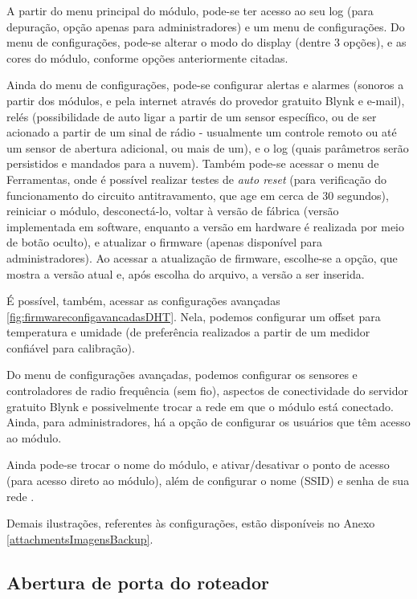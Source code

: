 A partir do menu principal do módulo, pode-se ter acesso ao seu log (para depuração, opção apenas para administradores) e um menu de configurações. Do menu de configurações, pode-se alterar o modo do display (dentre 3 opções), e as cores do módulo, conforme opções anteriormente citadas.

Ainda do menu de configurações, pode-se configurar alertas e alarmes (sonoros a partir dos módulos, e pela internet através do provedor gratuito Blynk e e-mail), relés (possibilidade de auto ligar a partir de um sensor específico, ou de ser acionado a partir de um sinal de rádio - usualmente um controle remoto ou até um sensor de abertura adicional, ou mais de um), e o log (quais parâmetros serão persistidos e mandados para a nuvem). Também pode-se acessar o menu de Ferramentas, onde é possível realizar testes de \emph{auto reset} (para verificação do funcionamento do circuito antitravamento, que age em cerca de 30 segundos), reiniciar o módulo, desconectá-lo, voltar à versão de fábrica (versão implementada em software, enquanto a versão em hardware é realizada por meio de botão oculto), e atualizar o firmware (apenas disponível para administradores).
Ao acessar a atualização de firmware, escolhe-se a opção, que mostra a versão atual e, após escolha do arquivo, a versão a ser inserida.

É possível, também, acessar as configurações avançadas \ref{fig:firmwareconfigavancadasDHT}. Nela, podemos configurar um offset para temperatura e umidade (de preferência realizados a partir de um medidor confiável para calibração).

Do menu de configurações avançadas, podemos configurar os sensores e controladores de radio frequência (sem fio), aspectos de conectividade do servidor gratuito Blynk e possivelmente trocar a rede \wwifi em que o módulo está conectado. Ainda, para administradores, há a opção de configurar os usuários que têm acesso ao módulo.

Ainda pode-se trocar o nome do módulo, e ativar/desativar o ponto de acesso (para acesso direto ao módulo), além de configurar o nome (SSID) e senha de sua rede \wwifi.

Demais ilustrações, referentes às configurações, estão disponíveis no Anexo \ref{attachmentsImagensBackup}{}.

\subsection{Abertura de porta do roteador}

